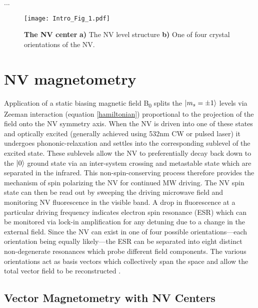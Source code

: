 ...

\begin{figure}[t!]
\centering
\texttt{[image: Intro\_Fig\_1.pdf]}  
\caption{\textbf{The NV center} \textbf{a)} The NV level structure \textbf{b)} One of four crystal orientations of the NV.}
\label{Fig_one}
\end{figure}

\section{NV magnetometry} %

Application of a static biasing magnetic field B\textsubscript{0} splits the $\ket{m_s = \pm1}$ levels via Zeeman interaction (equation \ref{hamiltonian}) proportional to the projection of the field onto the NV symmetry axis. When the NV is driven into one of these states and optically excited (generally achieved using 532nm CW or pulsed laser) it undergoes phononic-relaxation and settles into the corresponding sublevel of the excited state. These sublevels allow the NV to preferentially decay back down to the $\ket{0}$ ground state via an inter-system crossing and metastable state which are separated in the infrared. This non-spin-conserving process therefore provides the mechanism of spin polarizing the NV for continued MW driving. The NV spin state can then be read out by sweeping the driving microwave field and monitoring NV fluorescence in the visible band. A drop in fluorescence at a particular driving frequency indicates electron spin resonance (ESR) which can be monitored via lock-in amplification for any detuning due to a change in the external field\cite{jensen2017magnetometry,rondin2014magnetometry}. Since the NV can exist in one of four possible orientations---each orientation being equally likely---the ESR can be separated into eight distinct non-degenerate resonances which probe different field components. The various orientations act as basis vectors which collectively span the space and allow the total vector field to be reconstructed \cite{jensen2017magnetometry}. 

\subsection{Vector Magnetometry with NV Centers}\label{ch1:vect}

